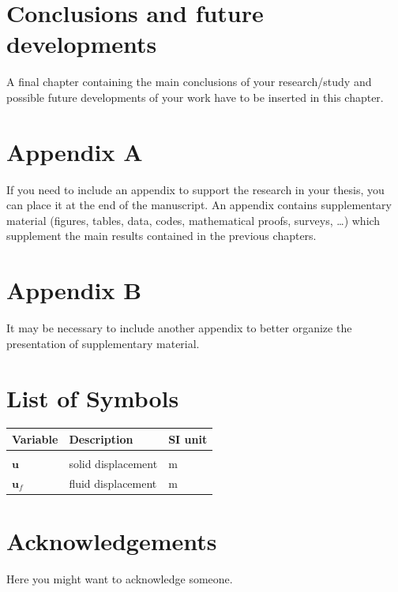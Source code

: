 \documentclass{Configuration_Files/PoliMi3i_thesis}
\begin{document}
\chapter{Conclusions and future developments}
\label{ch:conclusions}%
A final chapter containing the main conclusions of your research/study
and possible future developments of your work have to be inserted in this chapter. 




\cleardoublepage
{} %
\appendix
\chapter{Appendix A}
If you need to include an appendix to support the research in your thesis, you can place it at the end of the manuscript.
An appendix contains supplementary material (figures, tables, data, codes, mathematical proofs, surveys, \dots)
which supplement the main results contained in the previous chapters.

\chapter{Appendix B}
It may be necessary to include another appendix to better organize the presentation of supplementary material.


\listoffigures

\listoftables

\chapter*{List of Symbols} %
\begin{table}[H]
    \centering
    \begin{tabular}{lll}
        \textbf{Variable} & \textbf{Description} & \textbf{SI unit} \\\hline\\[-9px]
        $\bm{u}$ & solid displacement & m \\[2px]
        $\bm{u}_f$ & fluid displacement & m \\[2px]
    \end{tabular}
\end{table}

\chapter*{Acknowledgements}
Here you might want to acknowledge someone.

\cleardoublepage
\end{document}

